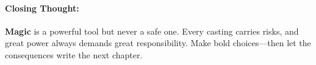 \begin{multicols}{2}
\paragraph{Closing Thought:}
\textbf{Magic} is a powerful tool but never a safe one. Every casting carries risks, and great power always demands great responsibility. Make bold choices—then let the consequences write the next chapter.

\end{multicols}

